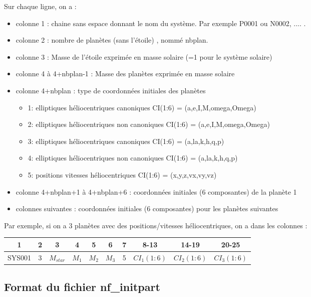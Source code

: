 \documentclass[11pt]{article}
\begin{document}
Sur chaque ligne, on a :
\begin{itemize}
\item colonne 1 : chaine sans espace donnant le nom du syst\`eme. Par exemple P0001 ou N0002, .... .
\item colonne 2 : nombre de plan\`etes (sans l'\'etoile) , nomm\'e nbplan.
\item colonne 3 : Masse de  l'\'etoile exprimée en masse solaire (=1 pour le système solaire)
\item colonne 4 \`a 4+nbplan-1 : Masse des plan\`etes exprimée en masse solaire 
\item colonne 4+nbplan : type de coordonn\'ees initiales des plan\`etes
\begin{itemize}
\item 1:  elliptiques h\'eliocentriques canoniques
	     CI(1:6) = (a,e,I,M,omega,Omega)
\item 2:  elliptiques h\'eliocentriques non canoniques
	     CI(1:6) = (a,e,I,M,omega,Omega)
\item 3:  elliptiques h\'eliocentriques canoniques
	     CI(1:6) = (a,la,k,h,q,p)
\item 4:  elliptiques h\'eliocentriques non canoniques
	     CI(1:6) = (a,la,k,h,q,p)
\item 5:  positions vitesses h\'eliocentriques
	     CI(1:6) = (x,y,z,vx,vy,vz)
\end{itemize}

\item colonne 4+nbplan+1 \`a  4+nbplan+6 :   coordonn\'ees initiales (6 composantes) de la plan\`ete 1
\item  colonnes suivantes :   coordonn\'ees initiales (6 composantes) pour les plan\`etes suivantes
\end{itemize}

 Par exemple, si on a 3 plan\`etes avec des positions/vitesses h\'eliocentriques, on a dans les colonnes :
 
\begin{tabular}{|c|c|c|c|c|c|c|c|c|c|} \hline
1 &  2 &  3 & 4 & 5 &6 &7 &8-13 &14-19 &20-25 \\ \hline
SYS001 & 3 & $M_{star}$  & $M_1$ &  $M_2$ & $M_3$  &5 &$CI_1(1:6)$ & $CI_2(1:6)$&$CI_3(1:6)$\\    \hline
\end{tabular}

\subsection{Format du fichier nf\_initpart}
\end{document}
